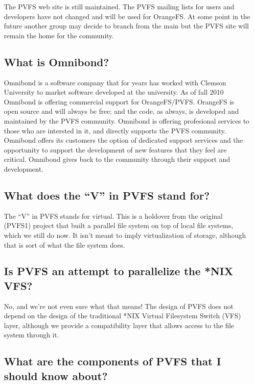 \documentclass[11pt,letterpaper]{article}
\begin{document}
The PVFS web site is still maintained.  The PVFS mailing lists for
users and developers have not changed and will be used for OrangeFS.
At some point in the future
another group may decide to branch from the main but the PVFS site will
remain the home for the community.

\subsection{What is Omnibond?}

Omnibond is a software company that for years has worked with Clemson
University to market software developed at the university.  As of fall
2010 Omnibond is offering commercial support for OrangeFS/PVFS.
OrangeFS is open source and will always be free; and the code, as
always, is developed and maintained by the PVFS community.  Omnibond is
offering profesional services to those who are intersted in it, and
directly supports the PVFS community.  Omnibond offers its customers the
option of dedicated support services and the opportunity to support the
development of new features that they feel are critical.  Omnibond gives
back to the community through their support and development.

\subsection{What does the ``V'' in PVFS stand for?}

The ``V'' in PVFS stands for virtual.  This is a holdover from the original
(PVFS1) project that built a parallel file system on top of local file
systems, which we still do now.  It isn't meant to imply virtualization of
storage, although that is sort of what the file system does.

\subsection{Is PVFS an attempt to parallelize the *NIX VFS?}

No, and we're not even sure what that means!  The design of PVFS does
not depend on the design of the traditional *NIX Virtual Filesystem
Switch (VFS) layer, although we provide a compatibility layer that
allows access to the file system through it.

\subsection{What are the components of PVFS that I should know about?}
\end{document}
